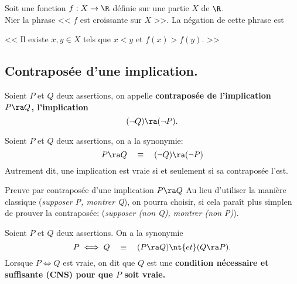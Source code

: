 \documentclass[11pt]{article}
\begin{document}
\vspace*{0.3cm}

\begin{ex}{}{}
    Soit une fonction $f:X\to\R$ définie sur une partie $X$ de $\R$.\\
    Nier la phrase << $f$ est croissante sur $X$ >>.
    \tcblower
    La négation de cette phrase est
    \begin{center}
        << Il existe $x,y\in X$ tels que $x<y$ et $f(x)>f(y)$. >>
    \end{center}
\end{ex}

\subsection{Contraposée d'une implication.}

\begin{defi}{}{}
    Soient $P$ et $Q$ deux assertions, on appelle \bf{contraposée} de l'implication $P\ra Q$, l'implication
    \begin{equation*}
        (\lnot Q) \ra (\lnot P).
    \end{equation*}
\end{defi}

\begin{thm}{}{}
    Soient $P$ et $Q$ deux assertions, on a la synonymie:
    \begin{equation*}
        P \ra Q \quad \equiv \quad (\lnot Q) \ra (\lnot P)
    \end{equation*}
    Autrement dit, une implication est vraie si et seulement si sa contraposée l'est.
\end{thm}

\begin{meth}{Preuve par contraposée d'une implication $P\ra Q$}{}
    Au lieu d'utiliser la manière classique (\emph{supposer P, montrer Q}), on pourra choisir, si cela paraît plus simplen de prouver la contraposée: (\emph{supposer (non Q), montrer (non P)}).
\end{meth}

\begin{prop}{}{}
    Soient $P$ et $Q$ deux assertions. On a la synonymie
    \begin{equation*}
        P \iff Q \quad \equiv \quad (P \ra Q) \nt{ et } (Q\ra P).
    \end{equation*}
    Lorsque $P\iff Q$ est vraie, on dit que $Q$ est une \bf{condition nécessaire et suffisante} (CNS) pour que $P$ soit vraie.
\end{prop}
\end{document}
